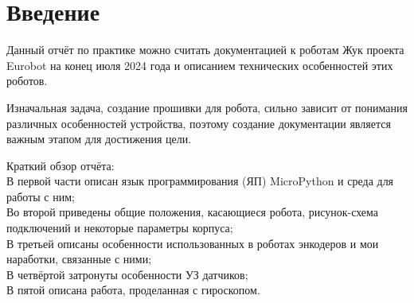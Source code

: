 \chapter*{Введение}
Данный отчёт по практике можно считать документацией к роботам Жук проекта Eurobot на конец июля 2024 года и описанием технических особенностей этих роботов.

Изначальная задача, создание прошивки для робота, сильно зависит от понимания различных особенностей устройства, поэтому создание документации является важным этапом для достижения цели.

Краткий обзор отчёта:\\
В первой части описан язык программирования (ЯП) MicroPython и среда для работы с ним;\\
Во второй приведены общие положения, касающиеся робота, рисунок-схема подключений и некоторые параметры корпуса;\\
В третьей описаны особенности использованных в роботах энкодеров и мои наработки, связанные с ними;\\
В четвёртой затронуты особенности УЗ датчиков;\\
В пятой описана работа, проделанная с гироскопом.
